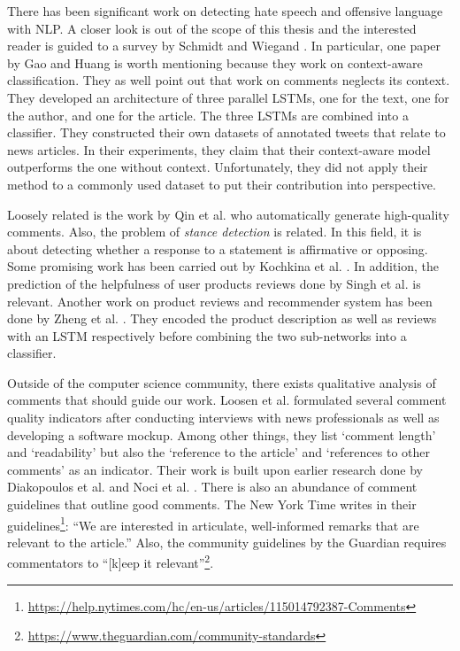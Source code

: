 There has been significant work on detecting hate speech and offensive language with NLP. A closer look is out of the scope of this thesis and the interested reader is guided to a survey by Schmidt and Wiegand \cite{schmidt2017survey}. In particular, one paper by Gao and Huang \cite{Gao_2017} is worth mentioning because they work on context-aware classification. They as well point out that work on comments neglects its context. They developed an architecture of three parallel LSTMs, one for the text, one for the author, and one for the article. The three LSTMs are combined into a classifier. They constructed their own datasets of annotated tweets that relate to news articles. In their experiments, they claim that their context-aware model outperforms the one without context. Unfortunately, they did not apply their method to a commonly used dataset to put their contribution into perspective. 

Loosely related is the work by Qin et al. \cite{2018arXiv180503668Q} who automatically generate high-quality comments. Also, the problem of \textit{stance detection} is related. In this field, it is about detecting whether a response to a statement is affirmative or opposing. Some promising work has been carried out by Kochkina et al. \cite{kochkina2017turing}. In addition, the prediction of the helpfulness of user products reviews done by Singh et al. \cite{SINGH2017346} is relevant. Another work on product reviews and recommender system has been done by Zheng et al. \cite{Zheng:2017:JDM:3018661.3018665}. They encoded the product description as well as reviews with an LSTM respectively before combining the two sub-networks into a classifier. 

Outside of the computer science community, there exists qualitative analysis of comments that should guide our work. Loosen et al. \cite{loosen_making_2017} formulated several comment quality indicators after conducting interviews with news professionals as well as developing a software mockup. Among other things, they list `comment length' and `readability' but also the `reference to the article' and `references to other comments' as an indicator. Their work is built upon earlier research done by Diakopoulos et al. \cite{Diakopoulos:2011:TQD:1958824.1958844} and Noci et al. \cite{noci2012comments}. There is also an abundance of comment guidelines that outline good comments. The New York Time writes in their guidelines\footnote{\url{https://help.nytimes.com/hc/en-us/articles/115014792387-Comments}}: ``We are interested in articulate, well-informed remarks that are relevant to the article.'' Also, the community guidelines by the Guardian requires commentators to ``[k]eep it relevant''\footnote{\url{https://www.theguardian.com/community-standards}}.

